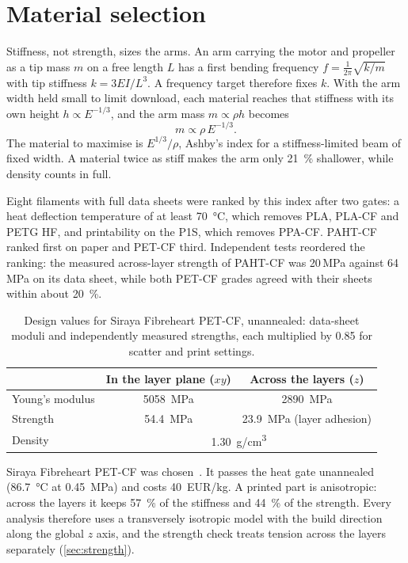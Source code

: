 \section{Material selection}\label{sec:material}

Stiffness, not strength, sizes the arms. An arm carrying the motor and propeller as a tip mass $m$ on a free length $L$ has a first bending frequency $f = \frac{1}{2\pi}\sqrt{k/m}$ with tip stiffness $k = 3EI/L^3$. A frequency target therefore fixes $k$. With the arm width held small to limit download, each material reaches that stiffness with its own height $h \propto E^{-1/3}$, and the arm mass $m \propto \rho h$ becomes
\begin{equation}
m \propto \rho\, E^{-1/3}.
\end{equation}
The material to maximise is $E^{1/3}/\rho$, Ashby's index for a stiffness-limited beam of fixed width. A material twice as stiff makes the arm only \SI{21}{\percent} shallower, while density counts in full.

Eight filaments with full data sheets were ranked by this index after two gates: a heat deflection temperature of at least \SI{70}{\celsius}, which removes PLA, PLA-CF and PETG HF, and printability on the P1S, which removes PPA-CF. PAHT-CF ranked first on paper and PET-CF third. Independent tests reordered the ranking: the measured across-layer strength of PAHT-CF was 20\,MPa against 64\,MPa on its data sheet, while both PET-CF grades agreed with their sheets within about \SI{20}{\percent}.

\begin{table}[htbp]
\centering\small
\caption{Design values for Siraya Fibreheart PET-CF, unannealed: data-sheet moduli and independently measured strengths, each multiplied by 0.85 for scatter and print settings.}\label{tab:material}
\begin{tabular}{@{}lcc@{}}
\toprule
 & In the layer plane ($xy$) & Across the layers ($z$)\\
\midrule
Young's modulus & \SI{5058}{MPa} & \SI{2890}{MPa}\\
Strength & \SI{54.4}{MPa} & \SI{23.9}{MPa} (layer adhesion)\\
\midrule
Density & \multicolumn{2}{c}{\SI{1.30}{g/cm^3}}\\
\bottomrule
\end{tabular}
\end{table}

Siraya Fibreheart PET-CF was chosen~\citep{siraya_petcf,mytechfun_siraya}. It passes the heat gate unannealed (\SI{86.7}{\celsius} at \SI{0.45}{MPa}) and costs \SI{40}{EUR/kg}. A printed part is anisotropic: across the layers it keeps \SI{57}{\percent} of the stiffness and \SI{44}{\percent} of the strength. Every analysis therefore uses a transversely isotropic model with the build direction along the global $z$ axis, and the strength check treats tension across the layers separately (\cref{sec:strength}).
